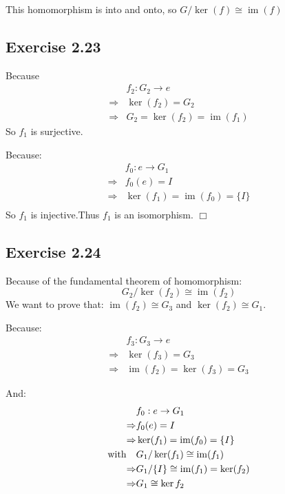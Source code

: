 \documentclass[]{ctexart}
\begin{document}
		This homomorphism is into and onto, so $G/\operatorname{ker}(f)\cong \operatorname{im}(f)$
		
		\subsection{Exercise 2.23}
		Because
		\begin{equation*}
		\begin{aligned}
		&f_2: G_2\rightarrow e\\
		\Rightarrow & \operatorname{ker}(f_2)=G_2\\
		\Rightarrow & G_2=\operatorname{ker}(f_2)=\operatorname{im}(f_1)
		\end{aligned}
		\end{equation*}
		So $ f_1 $ is surjective.
		
		Because:
		\begin{equation*}
		\begin{aligned}
		&f_0:e\rightarrow G_1\\
		\Rightarrow & f_0(e)=I\\
		\Rightarrow & \operatorname{ker}(f_1)=\operatorname{im}(f_0)=\{I\}\\
		\end{aligned}
		\end{equation*} 
		So $f_1$ is injective.Thus $ f_1 $ is an isomorphism. \qquad $ \Box $
		
		\subsection{Exercise 2.24}
		Because of the fundamental theorem of homomorphism:
		\begin{equation*}
		G_2/\operatorname{ker}(f_2)\cong \operatorname{im}(f_2)
		\end{equation*}
		We want to prove that: $\operatorname{im}(f_2)\cong G_3$ and $\operatorname{ker}(f_2)\cong G_1$.
		
		Because:
		\begin{equation*}
		\begin{aligned}
		&f_3: G_3\rightarrow e\\
		\Rightarrow & \operatorname{ker}(f_3)=G_3\\
		\Rightarrow & \operatorname{im}(f_2)=\operatorname{ker}(f_3)=G_3
		\end{aligned}
		\end{equation*}
		
		And:
		\begin{equation*}
		\begin{aligned}
		&f_0:e\rightarrow G_1\\
		\Rightarrow & f_0(e)=I\\
		\Rightarrow & \operatorname{ker}(f_1)=\operatorname{im}(f_0)=\{I\}\\
		{\rm with}\quad & G_1/\operatorname{ker}(f_1)\cong \operatorname{im}(f_1)\\
		\Rightarrow & G_1/\{I\}\cong \operatorname{im}(f_1)= \operatorname{ker}(f_2)\\
		\Rightarrow & G_1\cong \operatorname{ker}{f_2}
		\end{aligned}
		\end{equation*}
		
\end{document}
